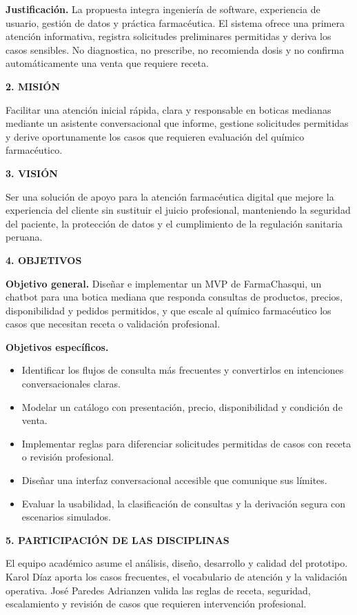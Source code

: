 \documentclass[11pt,a4paper]{article}
\newcommand{\apartado}[1]{\vspace{0.85em}\noindent\textbf{#1}\par\vspace{0.3em}}
\begin{document}
\textbf{Justificación.} La propuesta integra ingeniería de software, experiencia de usuario, gestión de datos y práctica farmacéutica. El sistema ofrece una primera atención informativa, registra solicitudes preliminares permitidas y deriva los casos sensibles. No diagnostica, no prescribe, no recomienda dosis y no confirma automáticamente una venta que requiere receta.

\apartado{2. MISIÓN}

Facilitar una atención inicial rápida, clara y responsable en boticas medianas mediante un asistente conversacional que informe, gestione solicitudes permitidas y derive oportunamente los casos que requieren evaluación del químico farmacéutico.

\apartado{3. VISIÓN}

Ser una solución de apoyo para la atención farmacéutica digital que mejore la experiencia del cliente sin sustituir el juicio profesional, manteniendo la seguridad del paciente, la protección de datos y el cumplimiento de la regulación sanitaria peruana.

\apartado{4. OBJETIVOS}

\textbf{Objetivo general.} Diseñar e implementar un MVP de FarmaChasqui, un chatbot para una botica mediana que responda consultas de productos, precios, disponibilidad y pedidos permitidos, y que escale al químico farmacéutico los casos que necesitan receta o validación profesional.

\textbf{Objetivos específicos.}
\begin{itemize}[leftmargin=1.5em,itemsep=0.3em]
    \item Identificar los flujos de consulta más frecuentes y convertirlos en intenciones conversacionales claras.
    \item Modelar un catálogo con presentación, precio, disponibilidad y condición de venta.
    \item Implementar reglas para diferenciar solicitudes permitidas de casos con receta o revisión profesional.
    \item Diseñar una interfaz conversacional accesible que comunique sus límites.
    \item Evaluar la usabilidad, la clasificación de consultas y la derivación segura con escenarios simulados.
\end{itemize}

\apartado{5. PARTICIPACIÓN DE LAS DISCIPLINAS}

El equipo académico asume el análisis, diseño, desarrollo y calidad del prototipo. Karol Díaz aporta los casos frecuentes, el vocabulario de atención y la validación operativa. José Paredes Adrianzen valida las reglas de receta, seguridad, escalamiento y revisión de casos que requieren intervención profesional.
\end{document}
